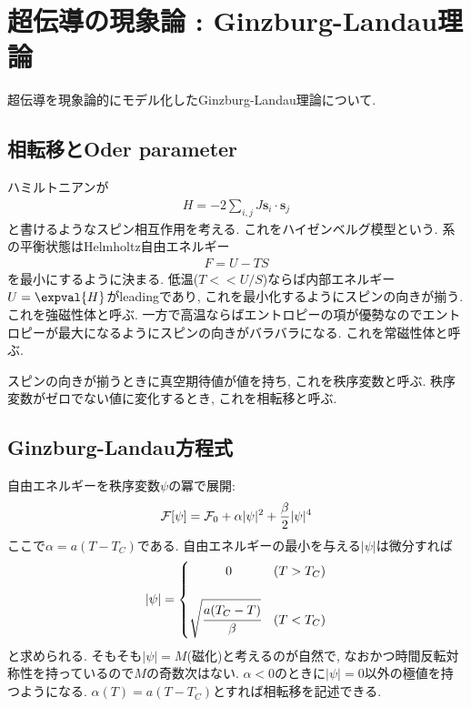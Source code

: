 \documentclass[10.5pt,a4paper]{jreport}
\begin{document}
\section{超伝導の現象論 : Ginzburg-Landau理論}
超伝導を現象論的にモデル化したGinzburg-Landau理論について. 
\subsection{相転移とOder parameter}
ハミルトニアンが
\begin{eqnarray}
  H = -2\sum_{i,j}J\bm{s}_i\cdot\bm{s}_j
\end{eqnarray}
と書けるようなスピン相互作用を考える. これをハイゼンベルグ模型という. 系の平衡状態はHelmholtz自由エネルギー
\begin{eqnarray}
  F = U -TS
\end{eqnarray}
を最小にするように決まる. 低温($T<\!<U/S$)ならば内部エネルギー$U=\expval{H}$がleadingであり, これを最小化するようにスピンの向きが揃う. これを強磁性体と呼ぶ.  一方で高温ならばエントロピーの項が優勢なのでエントロピーが最大になるようにスピンの向きがバラバラになる. これを常磁性体と呼ぶ.

スピンの向きが揃うときに真空期待値が値を持ち, これを秩序変数と呼ぶ. 秩序変数がゼロでない値に変化するとき, これを相転移と呼ぶ.
\subsection{Ginzburg-Landau方程式}
自由エネルギーを秩序変数$\psi$の冪で展開:
\begin{eqnarray}
  {\cal F}[\psi] = {\cal F}_0 + \alpha|\psi|^2 + \frac{\beta}{2}|\psi|^4
\end{eqnarray}
ここで$\alpha = a(T-T_C)$である. 自由エネルギーの最小を与える$|\psi|$は微分すれば
\begin{eqnarray}
  |\psi| =
  \begin{cases}
    \hspace{1cm}0&(T>T_C)\\
    \\
    \sqrt{\cfrac{a(T_C-T)}{\beta}}&(T<T_C)
  \end{cases}
\end{eqnarray}
と求められる. そもそも$|\psi| = M$(磁化)と考えるのが自然で, なおかつ時間反転対称性を持っているので$M$の奇数次はない. $\alpha<0$のときに$|\psi| = 0$以外の極値を持つようになる. $\alpha(T) = a(T-T_C)$とすれば相転移を記述できる.
\end{document}
